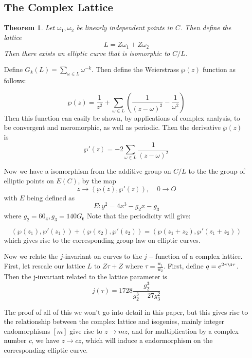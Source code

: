 \documentclass[12pt,twoside]{article}
\newtheorem{theorem}{Theorem}
\begin{document}
\subsection{The Complex Lattice}
\begin{theorem} 
Let $\omega_{1}, \omega_{2}$ be linearly independent points in $C$. Then define the lattice 
$$ L = Z\omega_{1} + Z \omega_{2}$$ Then there exists an elliptic curve that is isomorphic to $C/ L$. 
\end{theorem}
Define $G_{k}(L) = \sum_{\omega \in L}\omega^{-k}$. Then define the Weierstrass $\wp (z) $ function as follows: 

\begin{equation} 
\wp(z) = \frac{1}{z^{2}} + \sum_{\omega \in L}\left(\frac{1}{(z-\omega)^{2}} - \frac{1}{\omega^{2}}\right) 
\end{equation}  
Then this function can easily be shown, by applications of complex analysis, to be convergent and meromorphic, as well as periodic. Then the derivative $\wp(z)$ is 
\begin{equation} 
\wp ' (z) = -2 \sum_{\omega \in L} \frac{1}{(z- \omega)^{2}} 
\end{equation} 

Now we have a isomorphism from the additive group on $C/L$ to the the group of elliptic points on $E(C)$, by the map $$z \rightarrow ( \wp(z), \wp' (z)), \> \> \> \> \> 0 \rightarrow O $$ with $E$ being defined as 
\begin{equation} 
E: y^{2} = 4x^{3} - g_{2}x - g_{3} 
\end{equation} 
where $g_{2} = 60_{4}, g_{3} = 140G_{6}$  
Note that the periodicity will give: 

\begin{equation} 
(\wp(z_{1}), \wp'(z_{1})) + (\wp(z_{2}), \wp'(z_{2})) = (\wp(z_{1} + z_{2}), \wp'(z_{1} + z_{2})) 
\end{equation} which gives rise to the corresponding group law on elliptic curves. 

Now we relate the $j$-invariant on curves to the $j-$function of a complex lattice. First, let rescale our lattice $L$ to $Z\tau + Z$ where $\tau = \frac{w_{1}}{w_{2}}$. First, define $q = e^{2\pi \i \tau}$. Then the j-invariant related to the lattice parameter is 
\begin{equation}
j(\tau) = 1728 \frac{g_{2}^{3}}{g_{2}^{3} - 27 g_{3}^{2}} 
\end{equation} 
 
 
The proof of all of this we won't go into detail in this paper, but this gives rise to the relationship between the complex lattice and isogenies, mainly integer endomorphisms $[m]$ give rise to $ z \rightarrow mz$, and for multiplication by a complex number $c$, we have $z \rightarrow cz$, which will induce a endormorphism on the corresponding elliptic curve.   
\end{document}
